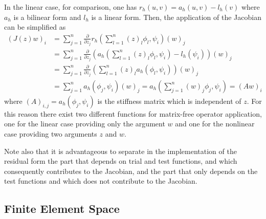 \documentclass[a4paper,12pt]{article}
\begin{document}
In the linear case, for comparison, one has $r_h(u,v) = a_h(u,v) - l_h(v)$ where
$a_h$ is a bilinear form and $l_h$ is a linear form. Then, the application
of the Jacobian can be simplified as
\begin{equation*}
\begin{split}
(J(z) w)_i &= \sum_{j=1}^n 
\frac{\partial}{\partial z_j} r_h\left(\sum_{l=1}^n (z)_l  \phi_l,\psi_i\right) (w)_j \\
&= \sum_{j=1}^n \frac{\partial}{\partial z_j} \left( 
a_h\left(\sum_{l=1}^n (z)_l  \phi_l,\psi_i\right) - l_h(\psi_i)\right) (w)_j \\
&= \sum_{j=1}^n \frac{\partial}{\partial z_j} \left( 
\sum_{l=1}^n (z)_l a_h(\phi_l,\psi_i) \right)  (w)_j \\
&= \sum_{j=1}^n a_h(\phi_j,\psi_i) (w)_j =
a_h\left( \sum_{j=1}^n (w)_j \phi_j,\psi_i\right) =
(A w)_i 
\end{split}
\end{equation*}
where $(A)_{i,j} = a_h(\phi_j,\psi_i)$ is the stiffness matrix which is independent of $z$.
For this reason there exist two different functions for matrix-free operator application,
one for the linear case providing only the argument $w$ and one for the nonlinear
case providing two arguments $z$ and $w$. 

Note also that it is advantageous to separate in the
implementation of the residual form the part that depends on trial and test functions,
and which consequently contributes to the Jacobian, and the part that only depends
on the test functions and which does not contribute to the Jacobian.

\subsection{Finite Element Space}
\end{document}
